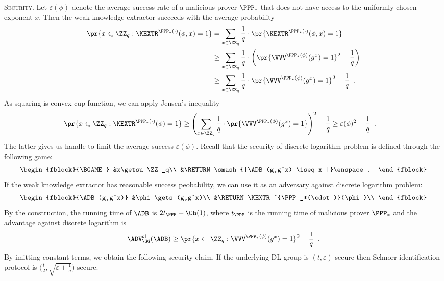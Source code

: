 \documentclass{crypto-exercise}
\begin{document}
\begin{solution}
\vspace*{2ex}
\noindent
\textsc{Security.} Let $\varepsilon(\phi)$ denote the average success rate of a malicious prover $\PPP_*$ that does not have access to the uniformly chosen exponent $x$. Then the weak knowledge extractor succeeds with the average probability
\begin{align*}
    \pr{\smash{x\getsu\ZZ_q:\KEXTR^{\PPP_*(\cdot)}(\phi,x)=1}}
    &=\sum_{x\in\ZZ_q}\frac{1}{q}\cdot \pr{\KEXTR^{\PPP_*(\cdot)}(\phi,x)=1}\\
    &\geq \sum_{x\in\ZZ_q}\frac{1}{q}\cdot 
      \biggl(\pr{\smash{\VVV^{\PPP_*(\phi)}(g^x)=1}}^2 - \frac{1}{q}\biggr)\\
    &\geq  \sum_{x\in\ZZ_q}\frac{1}{q}\cdot \pr{\smash{\VVV^{\PPP_*(\phi)}(g^x)=1}}^2-\frac{1}{q}\enspace. 
\end{align*}
As squaring is convex-cup function, we can apply Jensen's inequality 
\begin{align*}
    \pr{\smash{x\getsu\ZZ_q:\KEXTR^{\PPP_*(\cdot)}(\phi)=1}}
    &\geq  \Biggl(\sum_{x\in\ZZ_q}\frac{1}{q}\cdot \pr{\smash{\VVV^{\PPP_*(\phi)}(g^x)=1}}\Biggr)^2-\frac{1}{q}\geq \varepsilon(\phi)^2-\frac{1}{q}\enspace. 
\end{align*}
The latter gives us handle to limit the average success $\varepsilon(\phi)$. Recall that the security of discrete logarithm problem is defined through the following game:
\begin{align*}
\begin{fblock}{\BGAME}
&x\getsu\ZZ_q\\
&\RETURN \smash{[\ADB(g,g^x) \iseq x ]}\enspace.
\end{fblock}
\end{align*}
If the weak knowledge extractor has reasonable success peobability, we can use it as an adversary against discrete logarithm problem:
\begin{align*}
\begin{fblock}{\ADB(g,g^x)}
&\phi\gets(g,g^x)\\
&\RETURN \KEXTR^{\PPP_*(\cdot)}(\phi)\\
\end{fblock}
\end{align*}
By the construction, the running time of $\ADB$ is $2t_\PPP + \Oh(1)$, where $t_\PPP$ is
the running time of malicious prover $\PPP_*$ and the advantage against discrete logarithm is
\begin{align*}
\ADVDL{\GG}{\ADB}\geq \pr{x\gets\ZZ_q:\smash{\VVV^{\PPP_*(\phi)}(g^x)=1}}^2-\frac{1}{q}\enspace.
\end{align*}
By imitting constant terms, we obtain the following security claim. If the underlying DL group is $(t,\varepsilon)$-secure then Schnorr
identification protocol is
$\bigl(\frac{t}{2},\sqrt{\varepsilon+\frac{1}{q}}\bigr)$-secure.


\end{solution}
\end{document}
